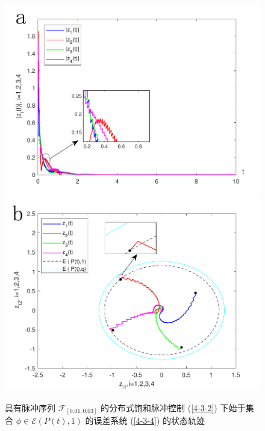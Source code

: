 \begin{figure}[H]
    \centering
    \includegraphics[scale=0.5]{./ch4/fig4-10-1.pdf}
    \includegraphics[scale=0.5]{./ch4/fig4-10-2.pdf} 
    \caption{具有脉冲序列 $\mathscr{F}_{[0.01,0.03]}$ 的分布式饱和脉冲控制 (\ref{4-3-2}) 下始于集合 $\phi\in \mathscr{E}( P(t),1)$ 的误差系统 (\ref{4-3-4}) 的状态轨迹}
    \label{f4-10}
\end{figure} 
